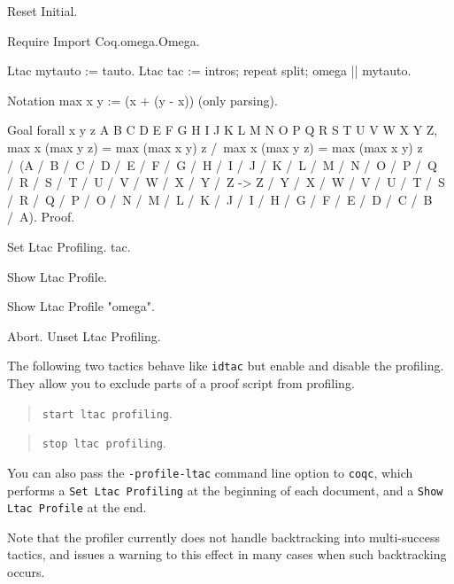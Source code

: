 \begin{coq_eval}
Reset Initial.
\end{coq_eval}
\begin{coq_example*}
Require Import Coq.omega.Omega.

Ltac mytauto := tauto.
Ltac tac := intros; repeat split; omega || mytauto.

Notation max x y := (x + (y - x)) (only parsing).
\end{coq_example*}
\begin{coq_example*}
Goal forall x y z A B C D E F G H I J K L M N O P Q R S T U V W X Y Z,
    max x (max y z) = max (max x y) z /\ max x (max y z) = max (max x y) z
    /\ (A /\ B /\ C /\ D /\ E /\ F /\ G /\ H /\ I /\ J /\ K /\ L /\ M /\ N /\ O /\ P /\ Q /\ R /\ S /\ T /\ U /\ V /\ W /\ X /\ Y /\ Z
        -> Z /\ Y /\ X /\ W /\ V /\ U /\ T /\ S /\ R /\ Q /\ P /\ O /\ N /\ M /\ L /\ K /\ J /\ I /\ H /\ G /\ F /\ E /\ D /\ C /\ B /\ A).
Proof.
\end{coq_example*}
\begin{coq_example}
  Set Ltac Profiling.
  tac.
\end{coq_example}
{\let\textit\texttt%
\begin{coq_example}
  Show Ltac Profile.
\end{coq_example}
\begin{coq_example}
  Show Ltac Profile "omega".
\end{coq_example}
}
\begin{coq_example*}
Abort.
Unset Ltac Profiling.
\end{coq_example*}

The following two tactics behave like {\tt idtac} but enable and disable the profiling. They allow you to exclude parts of a proof script from profiling.

\begin{quote}
{\tt start ltac profiling}.
\end{quote}

\begin{quote}
{\tt stop ltac profiling}.
\end{quote}

You can also pass the {\tt -profile-ltac} command line option to {\tt coqc}, which performs a {\tt Set Ltac Profiling} at the beginning of each document, and a {\tt Show Ltac Profile} at the end.

Note that the profiler currently does not handle backtracking into multi-success tactics, and issues a warning to this effect in many cases when such backtracking occurs.

